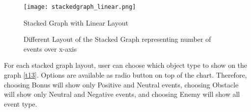 \begin{figure}
\centering
\texttt{[image: stackedgraph\_linear.png]}
\caption{Stacked Graph with Linear Layout}
\label{fig:linear}
\end{figure}

\begin{figure}[htp] %
\centering
{}\hfil
{}

\hfil
{}

\caption{Different Layout of the Stacked Graph representing number of events over x-axis}
\end{figure}

For each stacked graph layout, user can choose which object type to show on the graph \ref{t13}. Options are available as radio button on top of the chart. Therefore, choosing Bonus will show only Positive and Neutral events, choosing Obstacle will show only Neutral and Negative events, and choosing Enemy will show all event type.

